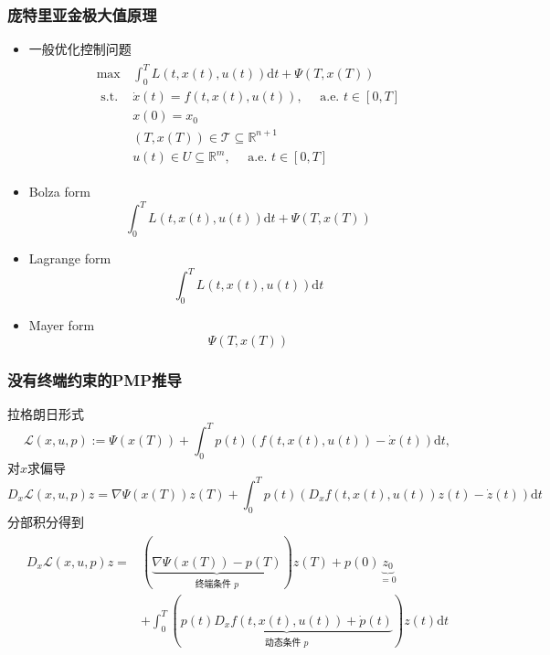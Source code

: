 \documentclass[UTF8, aspectratio=169, 10pt]{ctexbeamer}
\begin{document}
\begin{frame}
  \frametitle{庞特里亚金极大值原理}
  \begin{itemize}
    \item 一般优化控制问题
    \begin{align}
      \begin{split}
\max  \, & \int_{0}^{T} L(t, x(t), u(t)) \mathrm{d} t+\Psi(T, x(T)) \\
 \text { s.t. } & \dot{x}(t)=f(t, x(t), u(t)), \quad \text { a.e. } t \in[0, T] \\
& x(0)=x_{0} \\
& (T, x(T)) \in \mathcal{T} \subseteq \mathbb{R}^{n+1} \\
& u(t) \in U \subseteq \mathbb{R}^{m}, \quad \text { a.e. } t \in[0, T]
\end{split}
    \end{align}
    \item Bolza form
    $$ \int_{0}^{T} L(t, x(t), u(t)) \mathrm{d} t+\Psi(T, x(T)) $$
    \item Lagrange form
    $$ \int_{0}^{T} L(t, x(t), u(t)) \mathrm{d} t
    $$
    \item Mayer form
    $$ \Psi(T, x(T))
    $$ 
  \end{itemize}
\end{frame}

\begin{frame}
\frametitle{没有终端约束的PMP推导 }
拉格朗日形式
$$
  \mathcal{L}(x, u, p):=\Psi(x(T))+\int_{0}^{T} p(t)(f(t, x(t), u(t))-\dot{x}(t)) \mathrm{d} t,
$$
对$x$求偏导
$$
D_{x} \mathcal{L}(x, u, p) z=\nabla \Psi(x(T)) z(T)+\int_{0}^{T} p(t)\left(D_{x} f(t, x(t), u(t)) z(t)-\dot{z}(t)\right) \mathrm{d} t
$$
分部积分得到
\begin{align*}
  \begin{split}
  D_{x} \mathcal{L}(x, u, p) z=&(\underbrace{\nabla \Psi(x(T))-p(T)}_{\text {终端条件 } p}) z(T)+p(0) \underbrace{z_{0}}_{=0} \\
&+\int_{0}^{T}(\underbrace{p(t) D_{x} f(t, x(t), u(t))+\dot{p}(t)}_{\text {动态条件 } p}) z(t) \mathrm{d} t
  \end{split}
\end{align*}
\end{frame}
\end{document}
